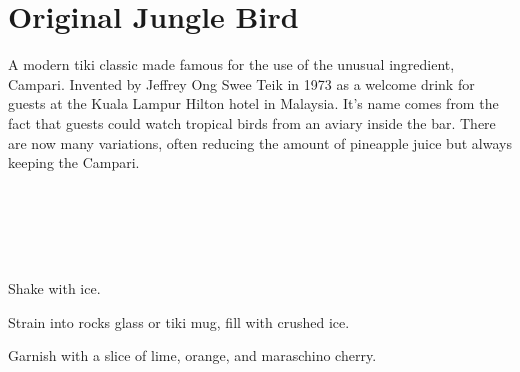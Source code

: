 \section[Jungle Bird]{
    Original Jungle Bird
}

\begin{recipestats}[
        servings=1,
        preptime=5~\minute,
        original=\citefield{originalJungleBird}{title}~\cite{originalJungleBird},
    ]
\end{recipestats}

\begin{recipeabstract}
    A modern tiki classic made famous for the use of the unusual ingredient, Campari.
    Invented by Jeffrey Ong Swee Teik in 1973 as a welcome drink for guests
    at the Kuala Lampur Hilton hotel in Malaysia\cite{cocktailSeminars2021}.
    It's name comes from the fact that guests could watch tropical birds from
    an aviary inside the bar.
    There are now many variations, often reducing the amount of pineapple
    juice but always keeping the Campari.
\end{recipeabstract}

\begin{ingredientcolumns}[1]
    \begin{ingredientblock}
        \\
        \\
        \\
        \\
    \end{ingredientblock}
\end{ingredientcolumns}

\begin{preparation}
\item Shake with ice.
\item Strain into rocks glass or tiki mug, fill with crushed ice.
\item Garnish with a slice of lime, orange, and maraschino cherry.
\end{preparation}

\recipeend%
